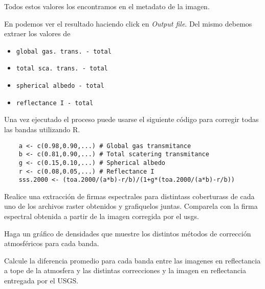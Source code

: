 Todos estos valores los encontramos en el metadato de la imagen.

En  podemos ver el resultado haciendo click en \emph{Output
file}. Del mismo debemos extraer los valores de
 \begin{itemize}
     \item \texttt{global gas. trans. - total}
     \item \texttt{total sca. trans. - total}
     \item \texttt{spherical albedo - total}
     \item \texttt{reflectance I - total}
 \end{itemize}

Una vez ejecutado el proceso puede usarse el siguiente c\'odigo para corregir
todas las bandas utilizando R.

\begin{lstlisting}
    a <- c(0.98,0.90,...) # Global gas transmitance
    b <- c(0.81,0.90,...) # Total scatering transmitance
    g <- c(0.15,0.10,...) # Spherical albedo
    r <- c(0.08,0.05,...) # Reflectance I
    sss.2000 <- (toa.2000/(a*b)-r/b)/(1+g*(toa.2000/(a*b)-r/b))
\end{lstlisting}


\begin{act}
    Realice una extracci\'on de firmas espectrales para distintass coberturass de
    cada uno de los archivos raster obtenidos y grafiquelos juntas.
    Comparela con la firma espectral obtenida a partir de la imagen corregida
    por el usgs.
\end{act}

\begin{act}
    Haga un gr\'afico de densidades que muestre los distintos m\'etodos de
    correcci\'on atmosf\'ericos para cada banda.
\end{act}

\begin{act}
    Calcule la diferencia promedio para cada banda entre las imagenes en
    reflectancia a tope de la atmosfera y las distintas correcciones
    y la imagen en reflectancia entregada por el USGS.
\end{act}
